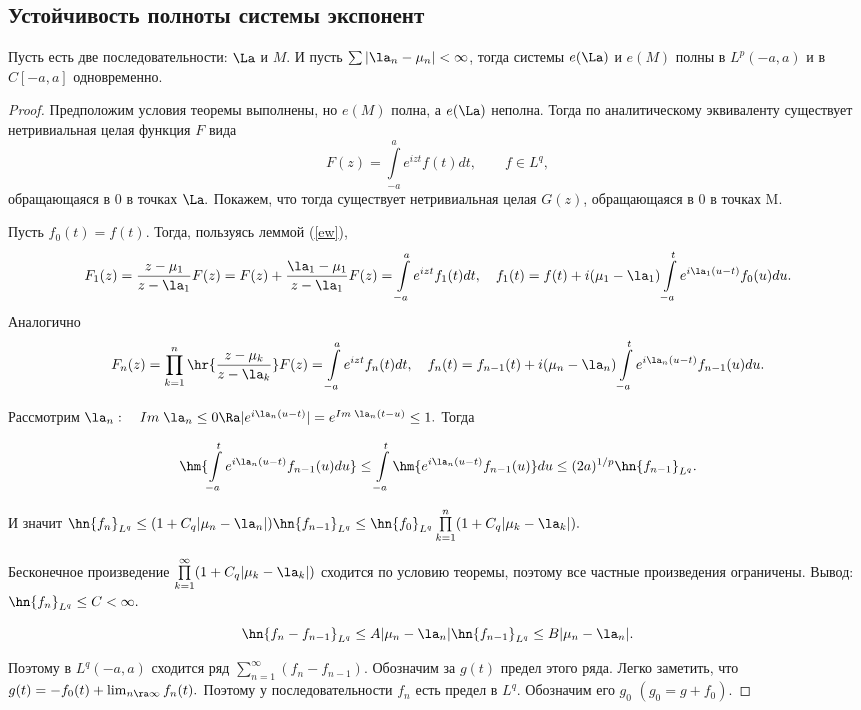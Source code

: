 \documentclass[a4paper]{article}
\begin{document}
\subsection{Устойчивость полноты системы экспонент}
\begin{theorem}
Пусть есть две последовательности: $\La$ и $M$. И пусть
$\sum|\la_n-\mu_n|<\infty$, тогда системы $e(\La)$ и
$e(M)$ полны в $L^p(-a,a)$ и в $C[-a,a]$ одновременно.
\end{theorem}
\begin{proof}
  Предположим условия теоремы выполнены, но
  $e(M)$ полна, а $e(\La)$ неполна. Тогда по аналитическому
  эквиваленту существует нетривиальная целая функция $F$ вида
  $$F(z)=\int\limits_{-a}^a e^{izt}f(t)dt,\qquad f\in L^q,$$
  обращающаяся в $0$ в точках $\La.$ Покажем, что тогда
  существует нетривиальная целая $G(z)$, обращающаяся в $0$ в точках
  M.

  Пусть $f_0(t)=f(t)$. Тогда, пользуясь леммой (\ref{ew}),
  \begin{equation*}
    F_1(z)=\frac{z-\mu_1}{z-\la_1}F(z)=F(z)+\frac{\la_1-\mu_1}{z-\la_1}F(z)=\int\limits_{-a}^ae^{izt}f_1(t)dt,\quad
    f_1(t)=f(t)+i(\mu_1-\la_1)\int\limits_{-a}^te^{i\la_1(u-t)}f_0(u)du.
  \end{equation*}
  Аналогично
  \begin{equation*}
    F_n(z)=\prod\limits_{k=1}^n\hr{\frac{z-\mu_k}{z-\la_k}}F(z)=\int\limits_{-a}^ae^{izt}f_n(t)dt,\quad
    f_n(t)=f_{n-1}(t)+i(\mu_n-\la_n)\int\limits_{-a}^te^{i\la_n(u-t)}f_{n-1}(u)du.
  \end{equation*}

  Рассмотрим $\la_n:\quad
  Im\;\la_n\le0\Ra|e^{i\la_n(u-t)}|=e^{Im\;\la_n(t-u)}\le1.$
  Тогда

  $$\hm{\int\limits_{-a}^te^{i\la_n(u-t)}f_{n-1}(u)du}\le\int\limits_{-a}^t\hm{e^{i\la_n(u-t)}f_{n-1}(u)}du\le(2a)^{1/p}\hn{f_{n-1}}_{L^q}.$$

  И значит
  $\hn{f_n}_{L^q}\le(1+C_q|\mu_n-\la_n|)\hn{f_{n-1}}_{L^q}\le\hn{f_0}_{L^q}\prod\limits_{k=1}^n(1+C_q|\mu_k-\la_k|).$

  Бесконечное произведение $\prod\limits_{k=1}^{\infty}(1+C_q|\mu_k-\la_k|)$ сходится по условию теоремы,
  поэтому все частные произведения ограничены. Вывод: $\hn{f_n}_{L^q}\le C<\infty.$

  $$\hn{f_n-f_{n-1}}_{L^q}\le
  A|\mu_n-\la_n| \hn{f_{n-1}}_{L^q}\le B|\mu_n-\la_n|.$$

  Поэтому в $L^q(-a,a)$ сходится ряд
  $\sum_{n=1}^{\infty}(f_n-f_{n-1})$. Обозначим за $g(t)$ предел
  этого ряда. Легко заметить, что
  $g(t)=-f_0(t)+\lim_{n\ra\infty}f_n(t).$ Поэтому у
  последовательности $f_n$ есть предел в $L^q$. Обозначим его $g_0$
  $(g_0=g+f_0).$


\end{proof}
\end{document}
